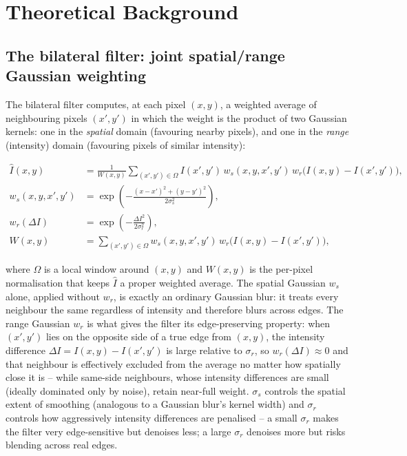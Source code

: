 \documentclass[11pt]{article}
\begin{document}
\section{Theoretical Background}

\subsection{The bilateral filter: joint spatial/range Gaussian weighting}

The bilateral filter computes, at each pixel $(x,y)$, a weighted average of
neighbouring pixels $(x',y')$ in which the weight is the product of two Gaussian
kernels: one in the \emph{spatial} domain (favouring nearby pixels), and one in the
\emph{range} (intensity) domain (favouring pixels of similar intensity):

\begin{align}
  \hat I(x,y) &= \frac{1}{W(x,y)}\sum_{(x',y')\in\Omega}
  I(x',y')\, w_s(x,y,x',y')\, w_r\big(I(x,y)-I(x',y')\big), \\
  w_s(x,y,x',y') &= \exp\!\left(-\frac{(x-x')^2+(y-y')^2}{2\sigma_s^2}\right), \\
  w_r(\Delta I) &= \exp\!\left(-\frac{\Delta I^2}{2\sigma_r^2}\right), \\
  W(x,y) &= \sum_{(x',y')\in\Omega} w_s(x,y,x',y')\, w_r\big(I(x,y)-I(x',y')\big),
  \label{eq:bilateral}
\end{align}

where $\Omega$ is a local window around $(x,y)$ and $W(x,y)$ is the per-pixel
normalisation that keeps $\hat I$ a proper weighted average. The spatial Gaussian
$w_s$ alone, applied without $w_r$, is exactly an ordinary Gaussian blur: it treats
every neighbour the same regardless of intensity and therefore blurs across edges.
The range Gaussian $w_r$ is what gives the filter its edge-preserving property: when
$(x',y')$ lies on the opposite side of a true edge from $(x,y)$, the intensity
difference $\Delta I = I(x,y)-I(x',y')$ is large relative to $\sigma_r$, so
$w_r(\Delta I)\approx 0$ and that neighbour is effectively excluded from the average
no matter how spatially close it is -- while same-side neighbours, whose intensity
differences are small (ideally dominated only by noise), retain near-full weight.
$\sigma_s$ controls the spatial extent of smoothing (analogous to a Gaussian blur's
kernel width) and $\sigma_r$ controls how aggressively intensity differences are
penalised -- a small $\sigma_r$ makes the filter very edge-sensitive but denoises
less; a large $\sigma_r$ denoises more but risks blending across real edges.
\end{document}
